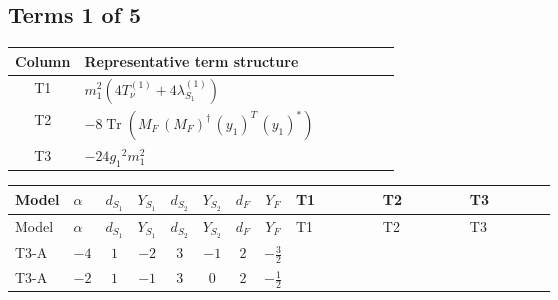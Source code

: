 \documentclass[8pt]{article}
\begin{document}
\begin{landscape}
\subsection*{Terms 1 of 5}
\begin{center}
\begin{tabular}{@{}c >{\raggedright\arraybackslash}p{0.82\linewidth}@{}}
\toprule
Column & Representative term structure \\
\midrule
T1 & \(\displaystyle {m_1^2} (4 T_{\nu}^{(1)}+4 {\lambda_{S_1}^{(1)}})\) \\
\midrule
T2 & \(\displaystyle -8 \operatorname{Tr}\!\left({M_F}\,\left({M_F}\right)^{\dagger}\,\left({y_1}\right)^{T}\,\left({y_1}\right)^{*}\right)\) \\
\midrule
T3 & \(\displaystyle -24 {g_1}^2 {m_1^2}\) \\
\midrule
\bottomrule
\end{tabular}
\end{center}
\smallskip
\tiny
\begin{longtable}{@{}llcccccc >{\raggedright\arraybackslash}p{0.21\linewidth} >{\raggedright\arraybackslash}p{0.21\linewidth} >{\raggedright\arraybackslash}p{0.21\linewidth}@{}}
\toprule
Model & $\alpha$ & $d_{S_1}$ & $Y_{S_1}$ & $d_{S_2}$ & $Y_{S_2}$ & $d_F$ & $Y_F$ & T1 & T2 & T3 \\
\midrule
\endfirsthead
\toprule
Model & $\alpha$ & $d_{S_1}$ & $Y_{S_1}$ & $d_{S_2}$ & $Y_{S_2}$ & $d_F$ & $Y_F$ & T1 & T2 & T3 \\
\midrule
\endhead
T3-A & $-4$ & $1$ & $-2$ & $3$ & $-1$ & $2$ & $-\frac{3}{2}$ & \scriptsize\adjustbox{max width=\linewidth}{$\begin{gathered} {m_1^2} (4 T_{\nu}^{(1)}+4 {\lambda_{S_1}^{(1)}})\end{gathered}$} & \scriptsize\adjustbox{max width=\linewidth}{$\begin{gathered} -8 \operatorname{Tr}\!\left({M_F}\,\left({M_F}\right)^{\dagger}\,\left({y_1}\right)^{T}\,\left({y_1}\right)^{*}\right)\end{gathered}$} & \scriptsize\adjustbox{max width=\linewidth}{$\begin{gathered} -24 {g_1}^2 {m_1^2}\end{gathered}$} \\
\midrule
T3-A & $-2$ & $1$ & $-1$ & $3$ & $0$ & $2$ & $-\frac{1}{2}$ & \scriptsize\adjustbox{max width=\linewidth}{$\begin{gathered} {m_1^2} (4 T_{\nu}^{(1)}+4 {\lambda_{S_1}^{(1)}})\end{gathered}$} & \scriptsize\adjustbox{max width=\linewidth}{$\begin{gathered} -8 \operatorname{Tr}\!\left({M_F}\,\left({M_F}\right)^{\dagger}\,\left({y_1}\right)^{T}\,\left({y_1}\right)^{*}\right)\end{gathered}$} & \scriptsize\adjustbox{max width=\linewidth}{$\begin{gathered} -6 {g_1}^2 {m_1^2}\end{gathered}$} \\

\end{longtable}
\end{landscape}
\end{document}
